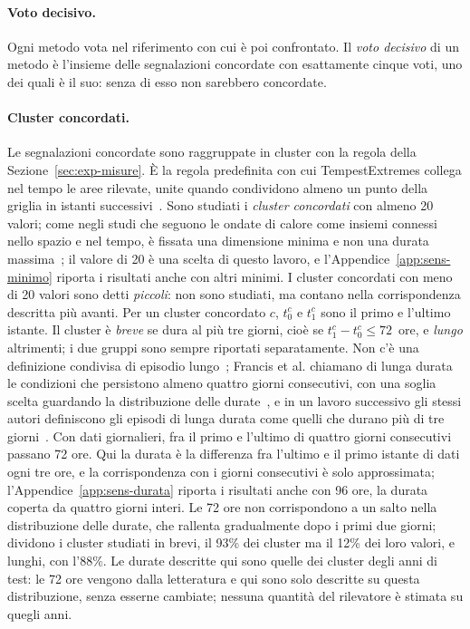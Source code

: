 \paragraph{Voto decisivo.} Ogni metodo vota nel riferimento con cui è poi confrontato. Il \emph{voto decisivo} di un metodo è l'insieme delle segnalazioni concordate con esattamente cinque voti, uno dei quali è il suo: senza di esso non sarebbero concordate.

\paragraph{Cluster concordati.} Le segnalazioni concordate sono raggruppate in cluster con la regola della Sezione~\ref{sec:exp-misure}. È la regola predefinita con cui \mbox{TempestExtremes} collega nel tempo le aree rilevate, unite quando condividono almeno un punto della griglia in istanti successivi~\cite{ullrich2021tempestextremes}. Sono studiati i \emph{cluster concordati} con almeno 20 valori; come negli studi che seguono le ondate di calore come insiemi connessi nello spazio e nel tempo, è fissata una dimensione minima e non una durata massima~\cite{mandonnet2026heatwaves,luo2024heatwaves}; il valore di 20 è una scelta di questo lavoro, e l'Appendice~\ref{app:sens-minimo} riporta i risultati anche con altri minimi. I cluster concordati con meno di 20 valori sono detti \emph{piccoli}: non sono studiati, ma contano nella corrispondenza descritta più avanti. Per un cluster concordato $c$, $t_0^c$ e $t_1^c$ sono il primo e l'ultimo istante. Il cluster è \emph{breve} se dura al più tre giorni, cioè se $t_1^c-t_0^c\le72$~ore, e \emph{lungo} altrimenti; i due gruppi sono sempre riportati separatamente. Non c'è una definizione condivisa di episodio lungo~\cite{pappert2025hotspells}; Francis et al. chiamano di lunga durata le condizioni che persistono almeno quattro giorni consecutivi, con una soglia scelta guardando la distribuzione delle durate~\cite{francis2018regimes}, e in un lavoro successivo gli stessi autori definiscono gli episodi di lunga durata come quelli che durano più di tre giorni~\cite{francis2020asia}. Con dati giornalieri, fra il primo e l'ultimo di quattro giorni consecutivi passano 72 ore. Qui la durata è la differenza fra l'ultimo e il primo istante di dati ogni tre ore, e la corrispondenza con i giorni consecutivi è solo approssimata; l'Appendice~\ref{app:sens-durata} riporta i risultati anche con 96 ore, la durata coperta da quattro giorni interi. Le 72 ore non corrispondono a un salto nella distribuzione delle durate, che rallenta gradualmente dopo i primi due giorni; dividono i cluster studiati in brevi, il 93\% dei cluster ma il 12\% dei loro valori, e lunghi, con l'88\%. Le durate descritte qui sono quelle dei cluster degli anni di test: le 72 ore vengono dalla letteratura e qui sono solo descritte su questa distribuzione, senza esserne cambiate; nessuna quantità del rilevatore è stimata su quegli anni.

